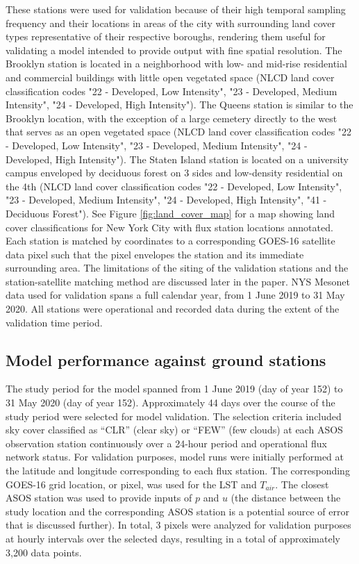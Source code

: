 These stations were used for validation because of their high temporal sampling frequency and their locations in areas of the city with surrounding land cover types representative of their respective boroughs, rendering them useful for validating a model intended to provide output with fine spatial resolution.  The Brooklyn station is located in a neighborhood with low- and mid-rise residential and commercial buildings with little open vegetated space (NLCD land cover classification codes "22 - Developed, Low Intensity", "23 - Developed, Medium Intensity", "24 - Developed, High Intensity"). The Queens station is similar to the Brooklyn location, with the exception of a large cemetery directly to the west that serves as an open vegetated space (NLCD land cover classification codes "22 - Developed, Low Intensity", "23 - Developed, Medium Intensity", "24 - Developed, High Intensity"). The Staten Island station is located on a university campus enveloped by deciduous forest on 3 sides and low-density residential on the 4th (NLCD land cover classification codes "22 - Developed, Low Intensity", "23 - Developed, Medium Intensity", "24 - Developed, High Intensity", "41 - Deciduous Forest"). See Figure \ref{fig:land_cover_map} for a map showing land cover classifications for New York City with flux station locations annotated. Each station is matched by coordinates to a corresponding GOES-16 satellite data pixel such that the pixel envelopes the station and its immediate surrounding area. The limitations of the siting of the validation stations and the station-satellite matching method are discussed later in the paper. NYS Mesonet data used for validation spans a full calendar year, from 1 June 2019 to 31 May 2020. All stations were operational and recorded data during the extent of the validation time period. 

\subsection{Model performance against ground stations}
The study period for the model spanned from 1 June 2019 (day of year 152) to 31 May 2020 (day of year 152).  Approximately 44 days over the course of the study period were selected for model validation. The selection criteria included sky cover classified as “CLR” (clear sky) or “FEW” (few clouds) at each ASOS observation station continuously over a 24-hour period and operational flux network status. For validation purposes, model runs were initially performed at the latitude and longitude corresponding to each flux station. The corresponding GOES-16 grid location, or pixel, was used for the LST and $T_{air}$. The closest ASOS station was used to provide inputs of $p$ and $u$ (the distance between the study location and the corresponding ASOS station is a potential source of error that is discussed further). In total, 3 pixels were analyzed for validation purposes at hourly intervals over the selected days, resulting in a total of approximately 3,200 data points. 

